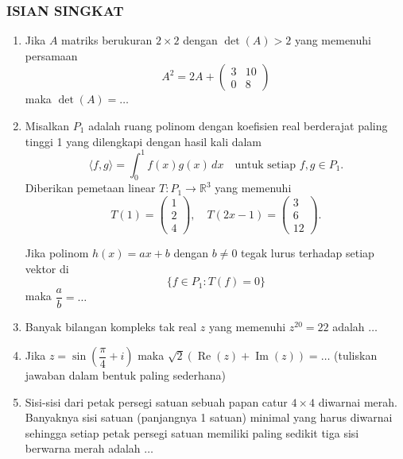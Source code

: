 \documentclass[12pt,twoside]{article}
\begin{document}
\subsubsection*{ISIAN SINGKAT}
\begin{enumerate}
	\item Jika $A$ matriks berukuran $2 \times 2$ dengan $\det(A) > 2$ yang memenuhi persamaan
	      \[
		      A^2 = 2A + \begin{pmatrix} 3 & 10 \\ 0 & 8 \end{pmatrix}
	      \]
	      maka $\det(A) = \ldots$

	\item Misalkan $P_1$ adalah ruang polinom dengan koefisien real berderajat paling tinggi 1 yang dilengkapi dengan hasil kali dalam
	      \[
		      \langle f,g \rangle = \int_0^1 f(x) g(x) \,dx \quad \text{untuk setiap $f,g \in P_1$.}
	      \]
	      Diberikan pemetaan linear $T : P_1 \to \mathbb{R}^3$ yang memenuhi
	      \[
		      T(1) = \begin{pmatrix} 1 \\ 2 \\ 4 \end{pmatrix}, \quad T(2x-1) = \begin{pmatrix} 3 \\ 6 \\ 12 \end{pmatrix}.
	      \]

	      Jika polinom $h(x) = ax + b$ dengan $b \neq 0$ tegak lurus terhadap setiap vektor di
	      \[
		      \{ f \in P_1 : T(f) = 0 \}
	      \]
	      maka $\dfrac{a}{b} = \ldots$

	\item Banyak bilangan kompleks tak real $z$ yang memenuhi $z^{20} = 22$ adalah $\ldots$

	\item Jika $z = \sin\left( \dfrac{\pi}{4} + i \right)$ maka $\sqrt{2}(\operatorname{Re}(z) + \operatorname{Im}(z)) = \ldots$ (tuliskan jawaban dalam bentuk paling sederhana)

	\item Sisi-sisi dari petak persegi satuan sebuah papan catur $4 \times 4$ diwarnai merah. Banyaknya sisi satuan (panjangnya 1 satuan) minimal yang harus diwarnai sehingga setiap petak persegi satuan memiliki paling sedikit tiga sisi berwarna merah adalah $\ldots$
\end{enumerate}
\end{document}
